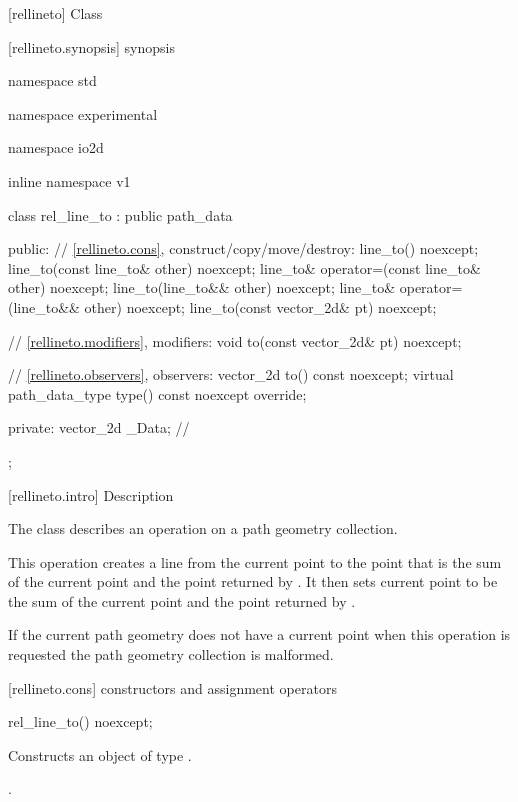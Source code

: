  [rellineto] {Class }

 [rellineto.synopsis] { synopsis}

\begin{codeblock}
namespace std { namespace experimental { namespace io2d { inline namespace v1 {
  class rel_line_to : public path_data {
  public:
    // \ref{rellineto.cons}, construct/copy/move/destroy:
    line_to() noexcept;
    line_to(const line_to& other) noexcept;
    line_to& operator=(const line_to& other) noexcept;
    line_to(line_to&& other) noexcept;
    line_to& operator=(line_to&& other) noexcept;
    line_to(const vector_2d& pt) noexcept;

    // \ref{rellineto.modifiers}, modifiers:
    void to(const vector_2d& pt) noexcept;

    // \ref{rellineto.observers}, observers:
    vector_2d to() const noexcept;
    virtual path_data_type type() const noexcept override;
    
  private:
    vector_2d _Data; // \expos
  };
} } } }
\end{codeblock}

 [rellineto.intro] { Description}

\pnum
{}
The class  describes an operation on a path geometry collection.

\pnum
This operation creates a line from the current point to the point that is the sum of the current point and the point returned by . It then sets current point to be the sum of the current point and the point returned by .

\pnum
If the current path geometry does not have a current point when this operation is requested the path geometry collection is malformed.

 [rellineto.cons] { constructors and assignment operators}

\begin{itemdecl}
    rel_line_to() noexcept;
\end{itemdecl}
\begin{itemdescr}
	\pnum
	\effects
	Constructs an object of type .
	
	\pnum
	\postconditions
	.
\end{itemdescr}

